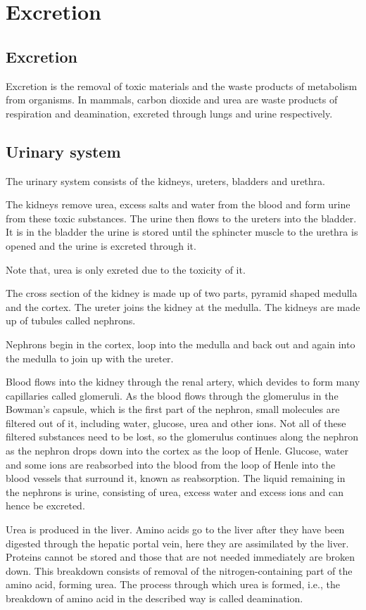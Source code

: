 \section{Excretion}
\subsection{Excretion}
Excretion is the removal of toxic materials and the waste products of metabolism from organisms. In
mammals, carbon dioxide and urea are waste products of respiration and deamination, excreted 
through lungs and urine respectively.

\subsection{Urinary system}
The urinary system consists of the kidneys, ureters, bladders and urethra.

The kidneys remove urea, excess salts and water from the blood and form urine from these toxic
substances. The urine then flows to the ureters into the bladder. It is in the bladder the urine
is stored until the sphincter muscle to the urethra is opened and the urine is excreted through it.

Note that, urea is only exreted due to the toxicity of it.

The cross section of the kidney is made up of two parts, pyramid shaped medulla and the cortex. The
ureter joins the kidney at the medulla. The kidneys are made up of tubules called nephrons.

Nephrons begin in the cortex, loop into the medulla and back out and again into the medulla to join
up with the ureter.

Blood flows into the kidney through the renal artery, which devides to form many capillaries
called glomeruli. As the blood flows through the glomerulus in the Bowman's capsule, which is the
first part of the nephron, small molecules are filtered out of it, including water, glucose, urea
and other ions. Not all of these filtered substances need to be lost, so the glomerulus continues 
along the nephron as the nephron drops down into the cortex as the loop of Henle. Glucose, water
and some ions are reabsorbed into the blood from the loop of Henle into the blood vessels that 
surround it, known as reabsorption. The liquid remaining in the nephrons is urine, consisting of
urea, excess water and excess ions and can hence be excreted.

Urea is produced in the liver. Amino acids go to the liver after they have been digested through
the hepatic portal vein, here they are assimilated by the liver. Proteins cannot be stored and 
those that are not needed immediately are broken down. This breakdown consists of removal of the
nitrogen-containing part of the amino acid, forming urea. The process through which urea is formed,
i.e., the breakdown of amino acid in the described way is called deamination.

